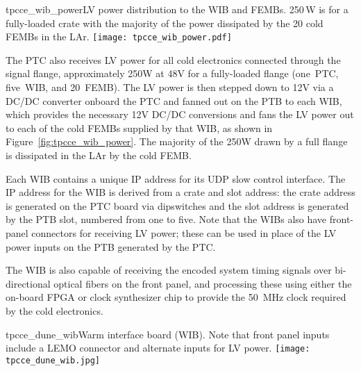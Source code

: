\begin{cdrfigure}{tpcce_wib_power}{LV power distribution 
to the WIB and FEMBs. 250\,W is for a fully-loaded crate 
with the majority of the power dissipated by the 20 cold FEMBs in the LAr.}
\texttt{[image: tpcce\_wib\_power.pdf]} %
\end{cdrfigure}

The PTC also receives LV power for all cold
electronics connected through the signal flange, approximately 250W at 48V for a
fully-loaded flange (one~PTC, five~WIB, and 20~FEMB). The LV power is then stepped down
to 12V via a DC/DC converter onboard the PTC and fanned out
on the PTB to each WIB, which provides the necessary 12V DC/DC conversions and fans
the LV power out to each of the cold FEMBs supplied by that WIB, 
as shown in Figure~\ref{fig:tpcce_wib_power}. The 
majority of the 250W drawn by a full flange is dissipated in the LAr
by the cold FEMB.



Each WIB contains a 
unique IP address for its UDP slow control interface. The IP address for the WIB is 
derived from a crate and slot address: the crate address is generated on the PTC 
board via dipswitches and the slot address is generated by the PTB slot, numbered 
from one to five. Note that the WIBs also have front-panel
connectors for receiving LV power; these can be used in place of 
the LV power inputs on the PTB generated by the PTC.

The WIB is also capable of
receiving the encoded system timing signals over bi-directional optical
fibers on the front panel, and processing these using either
the on-board FPGA or clock synthesizer chip to provide the 50~MHz
clock required by the cold electronics.  

\begin{cdrfigure}{tpcce_dune_wib}{Warm interface board (WIB). Note 
that front panel inputs include a LEMO connector and alternate inputs for LV power.}
\texttt{[image: tpcce\_dune\_wib.jpg]}
\end{cdrfigure}


